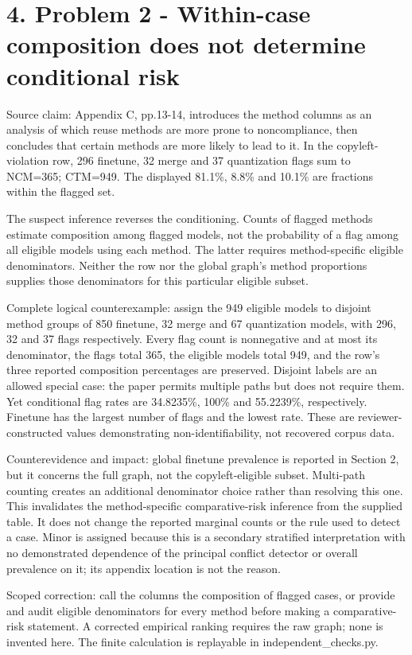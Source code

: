 \documentclass[10pt]{article}
\begin{document}
\section*{4. Problem 2 - Within-case composition does not determine conditional risk}
Source claim: Appendix C, pp.13-14, introduces the method columns as an analysis of which reuse methods are more prone to noncompliance, then concludes that certain methods are more likely to lead to it. In the copyleft-violation row, 296 finetune, 32 merge and 37 quantization flags sum to NCM=365; CTM=949. The displayed 81.1\%, 8.8\% and 10.1\% are fractions within the flagged set.\par
The suspect inference reverses the conditioning. Counts of flagged methods estimate composition among flagged models, not the probability of a flag among all eligible models using each method. The latter requires method-specific eligible denominators. Neither the row nor the global graph’s method proportions supplies those denominators for this particular eligible subset.\par
Complete logical counterexample: assign the 949 eligible models to disjoint method groups of 850 finetune, 32 merge and 67 quantization models, with 296, 32 and 37 flags respectively. Every flag count is nonnegative and at most its denominator, the flags total 365, the eligible models total 949, and the row’s three reported composition percentages are preserved. Disjoint labels are an allowed special case: the paper permits multiple paths but does not require them. Yet conditional flag rates are 34.8235\%, 100\% and 55.2239\%, respectively. Finetune has the largest number of flags and the lowest rate. These are reviewer-constructed values demonstrating non-identifiability, not recovered corpus data.\par
Counterevidence and impact: global finetune prevalence is reported in Section 2, but it concerns the full graph, not the copyleft-eligible subset. Multi-path counting creates an additional denominator choice rather than resolving this one. This invalidates the method-specific comparative-risk inference from the supplied table. It does not change the reported marginal counts or the rule used to detect a case. Minor is assigned because this is a secondary stratified interpretation with no demonstrated dependence of the principal conflict detector or overall prevalence on it; its appendix location is not the reason.\par
Scoped correction: call the columns the composition of flagged cases, or provide and audit eligible denominators for every method before making a comparative-risk statement. A corrected empirical ranking requires the raw graph; none is invented here. The finite calculation is replayable in independent\_checks.py.\par
\end{document}
